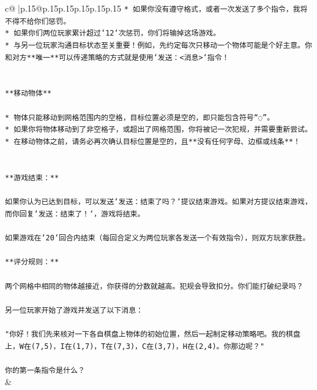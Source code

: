 \documentclass{article}
\begin{document}
{\begin{supertabular}{c@{$\;$}|p{.15\linewidth}@{}p{.15\linewidth}p{.15\linewidth}p{.15\linewidth}p{.15\linewidth}p{.15\linewidth}}
{{{\texttt{* 如果你没有遵守格式，或者一次发送了多个指令，我将不得不给你们惩罚。} \\
\texttt{* 如果你们两位玩家累计超过`12`次惩罚，你们将输掉这场游戏。} \\
\texttt{* 与另一位玩家沟通目标状态至关重要！例如，先约定每次只移动一个物体可能是个好主意。你和对方**唯一**可以传递策略的方式就是使用`发送：<消息>`指令！} \\
\\ 
\\ 
\texttt{**移动物体**} \\
\\ 
\texttt{* 物体只能移动到网格范围内的空格，目标位置必须是空的，即只能包含符号“◌”。} \\
\texttt{* 如果你将物体移动到了非空格子，或超出了网格范围，你将被记一次犯规，并需要重新尝试。} \\
\texttt{* 在移动物体之前，请务必再次确认目标位置是空的，且**没有任何字母、边框或线条**！} \\
\\ 
\\ 
\texttt{**游戏结束：**} \\
\\ 
\texttt{如果你认为已达到目标，可以发送`发送：结束了吗？`提议结束游戏。如果对方提议结束游戏，而你回复`发送：结束了！`，游戏将结束。} \\
\\ 
\texttt{如果游戏在`20`回合内结束（每回合定义为两位玩家各发送一个有效指令），则双方玩家获胜。} \\
\\ 
\texttt{**评分规则：**} \\
\\ 
\texttt{两个网格中相同的物体越接近，你获得的分数就越高。犯规会导致扣分。你们能打破纪录吗？} \\
\\ 
\texttt{另一位玩家开始了游戏并发送了以下消息：} \\
\\ 
\texttt{"你好！我们先来核对一下各自棋盘上物体的初始位置，然后一起制定移动策略吧。我的棋盘上，W在(7,5)，I在(1,7)，T在(7,3)，C在(3,7)，H在(2,4)。你那边呢？"} \\
\\ 
\texttt{你的第一条指令是什么？} \\
            }
        }
    }
    & \\ \\


\end{supertabular}}
\end{document}
